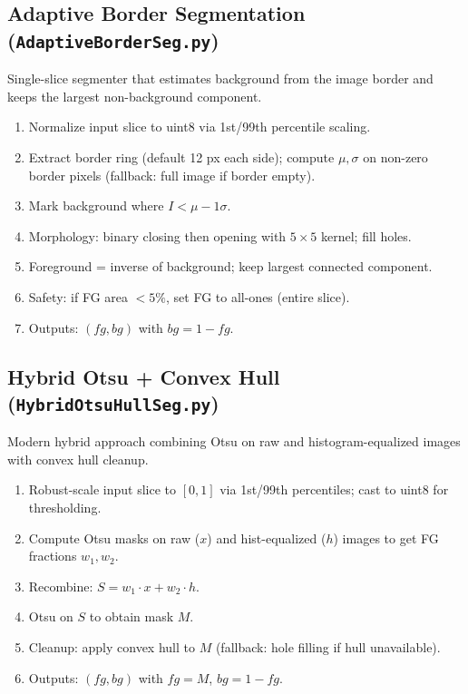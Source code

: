 \documentclass[11pt]{AmirGitDoc}
\begin{document}
\subsection{Adaptive Border Segmentation (\texttt{AdaptiveBorderSeg.py})}
Single-slice segmenter that estimates background from the image border and keeps the largest non-background component.
\begin{AmirAlgo}
\begin{enumerate}
    \item Normalize input slice to uint8 via 1st/99th percentile scaling.
    \item Extract border ring (default 12 px each side); compute $\mu,\sigma$ on non-zero border pixels (fallback: full image if border empty).
    \item Mark background where $I < \mu - 1\sigma$.
    \item Morphology: binary closing then opening with $5\times5$ kernel; fill holes.
    \item Foreground = inverse of background; keep largest connected component.
    \item Safety: if FG area $<5\%$, set FG to all-ones (entire slice).
    \item Outputs: $(fg, bg)$ with $bg = 1 - fg$.
\end{enumerate}
\end{AmirAlgo}

\subsection{Hybrid Otsu + Convex Hull (\texttt{HybridOtsuHullSeg.py})}
Modern hybrid approach combining Otsu on raw and histogram-equalized images with convex hull cleanup.
\begin{AmirAlgo}
\begin{enumerate}
    \item Robust-scale input slice to $[0,1]$ via 1st/99th percentiles; cast to uint8 for thresholding.
    \item Compute Otsu masks on raw ($x$) and hist-equalized ($h$) images to get FG fractions $w_1, w_2$.
    \item Recombine: $S = w_1 \cdot x + w_2 \cdot h$.
    \item Otsu on $S$ to obtain mask $M$.
    \item Cleanup: apply convex hull to $M$ (fallback: hole filling if hull unavailable).
    \item Outputs: $(fg, bg)$ with $fg = M$, $bg = 1 - fg$.
\end{enumerate}
\end{AmirAlgo}
\end{document}
